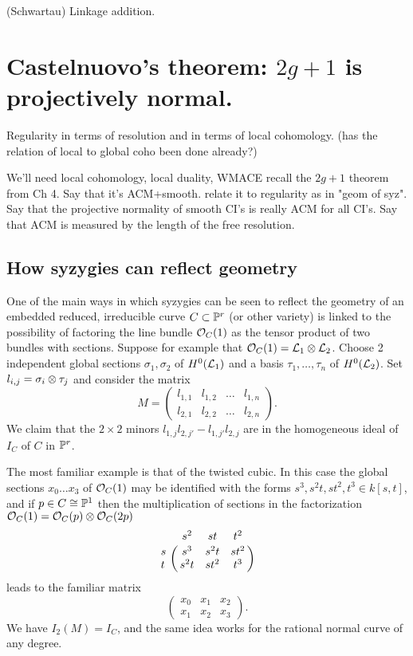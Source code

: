 \begin{exercise} (Schwartau) Linkage addition. 
 
\end{exercise}






\section{Castelnuovo's theorem: $2g+1$ is projectively normal.}


 Regularity in terms of resolution and in terms of local cohomology. (has the relation of local to global coho been done already?)

We'll need local cohomology, local duality, 
 WMACE
recall the $2g+1$ theorem from Ch 4. Say that it's ACM+smooth. relate it to regularity as in "geom of syz". Say that the projective
normality of smooth CI's is really ACM for all CI's. Say that ACM is measured by the length of the free resolution.




\subsection{How syzygies can reflect geometry}

One of the main ways in which syzygies can be seen to reflect the geometry of an embedded  reduced, irreducible curve $C\subset {\mathbb P}^r$
(or other variety) is linked to the possibility of factoring the line bundle ${\mathcal O}_C(1)$ as the tensor product of two bundles with sections. Suppose for example that ${\mathcal O}_C(1) = {\mathcal L}_1\otimes {\mathcal L}_2$. Choose 2 independent global sections
$\sigma_1, \sigma_2$ of  $H^0({\mathcal L}_1)$ and a basis $\tau_1,\dots, \tau_n$ of $H^0({\mathcal L}_2)$. Set
$l_{i,j}= \sigma_i\otimes \tau_j$ and consider the matrix 
$$
M = 
\begin{pmatrix}
 l_{1,1}&l_{1,2}&\dots&l_{1,n}\\
  l_{2,1}&l_{2,2}&\dots&l_{2,n}
\end{pmatrix}.
$$
We claim that  the $2\times 2$ minors $l_{1,j} l_{2,j'}-l_{1,j'}l_{2,j}$ are in the homogeneous ideal of $I_C$ of $C$ in ${\mathbb P}^r$. 

\begin{example}
The most familiar example is that of the twisted cubic. In this case the global sections $x_0\dots x_3$ of ${\mathcal O}_C(1)$ may be identified with the forms $s^3, s^2t, st^2, t^3 \in k[s,t]$, and if $p\in C \cong {\mathbb P}^1$ then the multiplication of sections
in the factorization  ${\mathcal O}_C(1) = {\mathcal O}_C(p) \otimes {\mathcal O}_C(2p)$ 
$$
\bordermatrix{
 &s^2&st&t^2\cr
 s& s^3&s^2t&st^2\cr
 t& s^2t&st^2&t^3
}
$$
 leads to the familiar matrix
$$
\begin{pmatrix}
x_0&x_1&x_2\\
x_1&x_2&x_3 
\end{pmatrix}.
$$
We have $I_2(M) = I_C$, and the same idea works for the rational normal curve of any degree.

\end{example}


